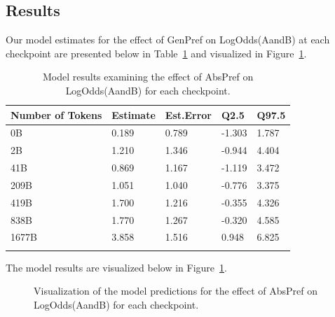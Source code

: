\documentclass[
  nottoc]{article}
\begin{document}
\subsection{Results}\label{results-1}

Our model estimates for the effect of GenPref on LogOdds(AandB) at each
checkpoint are presented below in Table~\ref{tbl-exp2m1} and visualized
in Figure~\ref{fig-exp2m1}.

\begin{longtable}[]{@{}lllll@{}}

\toprule\noalign{}
Number of Tokens & Estimate & Est.Error & Q2.5 & Q97.5 \\
\midrule\noalign{}
\endhead
\bottomrule\noalign{}
\endlastfoot
0B & 0.189 & 0.789 & -1.303 & 1.787 \\
2B & 1.210 & 1.346 & -0.944 & 4.404 \\
41B & 0.869 & 1.167 & -1.119 & 3.472 \\
209B & 1.051 & 1.040 & -0.776 & 3.375 \\
419B & 1.700 & 1.216 & -0.355 & 4.326 \\
838B & 1.770 & 1.267 & -0.320 & 4.585 \\
1677B & 3.858 & 1.516 & 0.948 & 6.825 \\


\caption{\label{tbl-exp2m1}Model results examining the effect of AbsPref
on LogOdds(AandB) for each checkpoint.}

\tabularnewline
\end{longtable}

The model results are visualized below in Figure~\ref{fig-exp2m1}.

\begin{figure}


\caption{\label{fig-exp2m1}Visualization of the model predictions for
the effect of AbsPref on LogOdds(AandB) for each checkpoint.}

\end{figure}%
\end{document}
